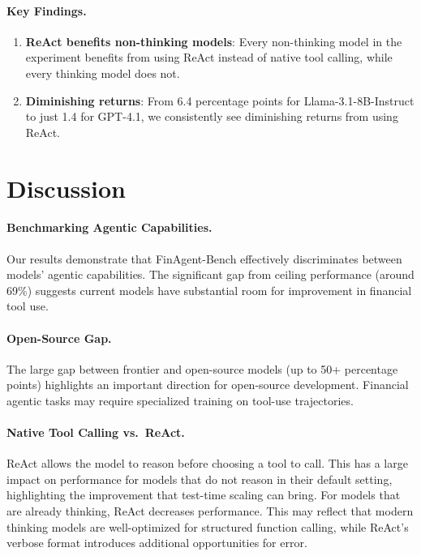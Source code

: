 \documentclass[11pt]{article}
\newcommand{\datasetname}{FinAgent-Bench\xspace}
\begin{document}
\paragraph{Key Findings.}
\begin{enumerate}
    \item \textbf{ReAct benefits non-thinking models}: Every non-thinking model in the experiment benefits from using ReAct instead of native tool calling, while every thinking model does not.
    \item \textbf{Diminishing returns}: From 6.4 percentage points for Llama-3.1-8B-Instruct to just 1.4 for GPT-4.1, we consistently see diminishing returns from using ReAct.
\end{enumerate}

\section{Discussion}

\paragraph{Benchmarking Agentic Capabilities.}
Our results demonstrate that \datasetname effectively discriminates between models' agentic capabilities. The significant gap from ceiling performance (around 69\%) suggests current models have substantial room for improvement in financial tool use.

\paragraph{Open-Source Gap.}
The large gap between frontier and open-source models (up to 50+ percentage points) highlights an important direction for open-source development. Financial agentic tasks may require specialized training on tool-use trajectories.

\paragraph{Native Tool Calling vs.\ ReAct.}
ReAct allows the model to reason before choosing a tool to call. This has a large impact on performance for models that do not reason in their default setting, highlighting the improvement that test-time scaling can bring. For models that are already thinking, ReAct decreases performance. This may reflect that modern thinking models are well-optimized for structured function calling, while ReAct's verbose format introduces additional opportunities for error.
\end{document}
